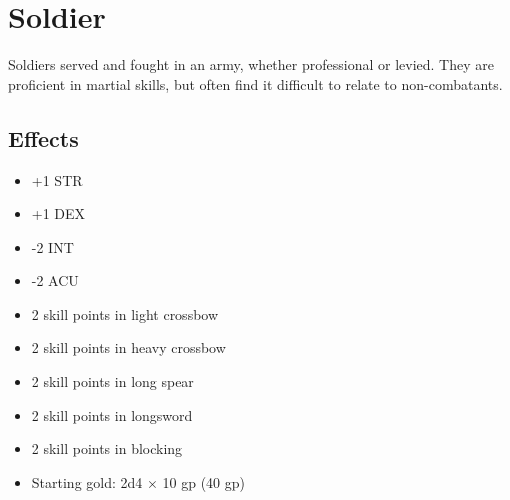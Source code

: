 \section{Soldier}\label{background:soldier}
Soldiers served and fought in an army, whether professional or levied. They
are proficient in martial skills, but often find it difficult to relate to
non-combatants.

\subsection*{Effects}
\begin{itemize}
    \item +1 STR
    \item +1 DEX
    \item -2 INT
    \item -2 ACU
    \item 2 skill points in light crossbow
    \item 2 skill points in heavy crossbow
    \item 2 skill points in long spear
    \item 2 skill points in longsword
    \item 2 skill points in blocking
    \item Starting gold: 2d4 $\times$ 10 gp (40 gp)
\end{itemize}
